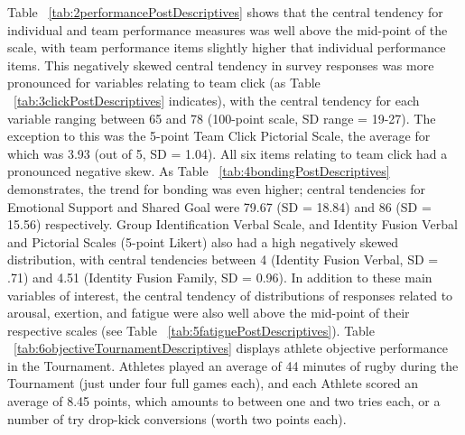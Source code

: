 Table ~\ref{tab:2performancePostDescriptives} shows that the central tendency for individual and team performance measures was well above the mid-point of the scale, with team performance items slightly higher that individual performance items.  This negatively skewed central tendency in survey responses was more pronounced for variables relating to team click (as Table ~\ref{tab:3clickPostDescriptives} indicates), with the central tendency for each variable ranging between 65 and 78 (100-point scale, SD range = 19-27). The exception to this was the 5-point Team Click Pictorial Scale, the average for which was 3.93 (out of 5, SD = 1.04).  All six items relating to team click had a pronounced negative skew.  As Table ~\ref{tab:4bondingPostDescriptives} demonstrates, the trend for bonding was even higher; central tendencies for Emotional Support and Shared Goal were 79.67 (SD = 18.84) and 86 (SD = 15.56) respectively.  Group Identification Verbal Scale, and Identity Fusion Verbal and Pictorial Scales (5-point Likert) also had a high negatively skewed distribution, with central tendencies between 4 (Identity Fusion Verbal, SD = .71) and 4.51 (Identity Fusion Family, SD = 0.96).
In addition to these main variables of interest, the central tendency of distributions of responses related to arousal, exertion, and fatigue were also well above the mid-point of their respective scales (see Table ~\ref{tab:5fatiguePostDescriptives}).  Table ~\ref{tab:6objectiveTournamentDescriptives} displays athlete objective performance in the Tournament. Athletes played an average of 44 minutes of rugby during the Tournament (just under four full games each), and each Athlete scored an average of 8.45 points, which amounts to between one and two tries each, or a number of try drop-kick conversions (worth two points each).






















